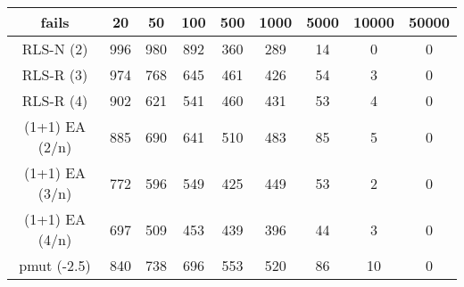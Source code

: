 \begin{tabular}[h]{ccccccccc}
fails&20&50&100&500&1000&5000&10000&50000\\\hline
RLS-N (2)&996&980&892&360&289&14&0&0\\
RLS-R (3)&974&768&645&461&426&54&3&0\\
RLS-R (4)&902&621&541&460&431&53&4&0\\
(1+1) EA (2/n)&885&690&641&510&483&85&5&0\\
(1+1) EA (3/n)&772&596&549&425&449&53&2&0\\
(1+1) EA (4/n)&697&509&453&439&396&44&3&0\\
pmut (-2.5)&840&738&696&553&520&86&10&0\\
\end{tabular}
